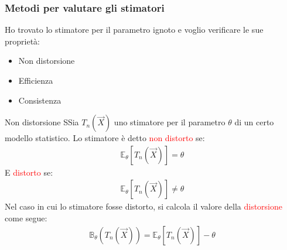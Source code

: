 \documentclass{article}  %
\theoremstyle{definition}
\begin{document}
\subsubsection{Metodi per valutare gli stimatori}
Ho trovato lo stimatore per il parametro ignoto e voglio verificare le sue proprietà:
\begin{itemize}
	\item Non distorsione
	\item Efficienza
	\item Consistenza
\end{itemize}
\begin{theorem}{Non distorsione}
	SSia $T_n(\vec{X})$ uno stimatore per il parametro $\theta$ di un certo modello statistico. Lo stimatore è detto \textcolor{red}{non distorto} se:
	\begin{align*}
		\mathbb{E}_{\theta}[T_n(\vec{X})] = \theta
	\end{align*}
	E \textcolor{red}{distorto} se:
	\begin{align*}
		\mathbb{E}_{\theta}[T_n(\vec{X})] \neq \theta
	\end{align*}
	Nel caso in cui lo stimatore fosse distorto, si calcola il valore della \textcolor{red}{distorsione} come segue:
	\begin{align*}
		\mathbb{B}_{\theta}(T_n(\vec{X})) = \mathbb{E}_{\theta}[T_n(\vec{X})] - \theta
	\end{align*}
\end{theorem}
\end{document}
